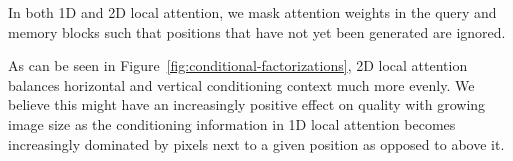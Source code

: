 In both 1D and 2D local attention, we mask attention weights in the query and memory blocks such that positions that have not yet been generated are ignored.

As can be seen in Figure~\ref{fig:conditional-factorizations}, 2D local attention balances horizontal and vertical conditioning context much more evenly. We believe this might have an increasingly positive effect on quality with growing image size as the conditioning information in 1D local attention becomes increasingly dominated by pixels next to a given position as opposed to above it. 





